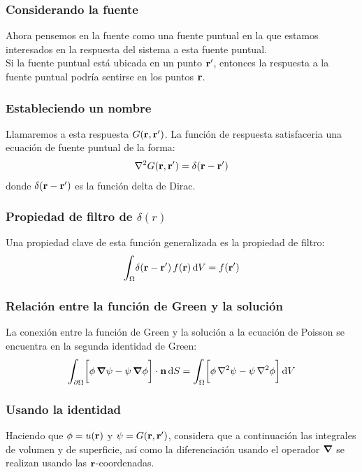 \documentclass[12pt]{beamer}
\begin{document}
\begin{frame}
\frametitle{Considerando la fuente}
Ahora pensemos en la fuente como una fuente puntual en la que estamos interesados en la respuesta del sistema a esta fuente puntual.
\\
\bigskip
\pause
Si la fuente puntual está ubicada en un punto $\vb{\ensuremath{{r}^{\prime}}}$, entonces la respuesta a la fuente puntual podría sentirse en los puntos $\vb{r}$.
\end{frame}

\begin{frame}
\frametitle{Estableciendo un nombre}
Llamaremos a esta respuesta $G(\vb{r}, \vb{\ensuremath{{r}^{\prime}}})$. \pause La función de respuesta satisfaceria una ecuación de fuente puntual de la forma:
\pause
\begin{align*}
\laplacian G(\vb{r}, \vb{\pderivada{r}}) = \delta (\vb{r} - \vb{\pderivada{r}})
\end{align*}
donde $\delta (\vb{r} - \vb{\ensuremath{{r}^{\prime}}})$ es la función delta de Dirac.
\end{frame}

\begin{frame}
\frametitle{Propiedad de filtro de $\delta (r)$}
Una propiedad clave de esta función generalizada es la propiedad de filtro:
\pause
\begin{align*}
\scaleint{6ex}_{\bs \Omega} \delta (\vb{r} - \vb{\pderivada{r}}) \, f (\vb{r}) \dd{V} = f (\vb{\pderivada{r}})
\end{align*}
\end{frame}

\begin{frame}
\frametitle{Relación entre la función de Green y la solución}
La conexión entre la función de Green y la solución a la ecuación de Poisson se encuentra en la segunda identidad de Green:
\pause
\begin{align*}
\scaleint{6ex}_{\bs \partial \Omega} \bigg[ \phi \, \grad{\psi} - \psi \, \grad{\phi} \bigg] \cdot \vb{n} \dd{S} = \scaleint{6ex}_{\bs \Omega} \bigg[ \phi \, \laplacian{\psi} - \psi \, \laplacian{\phi} \bigg] \dd{V}
\end{align*}
\end{frame}

\begin{frame}
\frametitle{Usando la identidad}
Haciendo que $\phi = u (\vb{r})$ y $\psi = G (\vb{r}, \vb{\ensuremath{{r}^{\prime}}})$, \pause considera que a continuación las integrales de volumen y de superficie, así como la diferenciación usando el operador $\grad$ se realizan usando las $\vb{r}$-coordenadas.
\end{frame}
\end{document}
